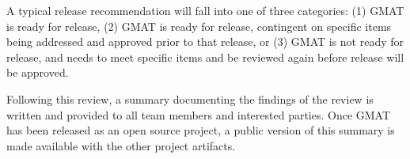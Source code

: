A typical release recommendation will fall into one of three categories: (1) GMAT is ready for release, (2) GMAT is ready for release, contingent on specific items being addressed and approved prior to that release, or (3) GMAT is not ready for release, and needs to meet specific items and be reviewed again before release will be approved.

Following this review, a summary documenting the findings of the review is written and provided to all team members and interested parties.  Once GMAT has been released as an open source project, a public version of this summary is made available with the other project artifacts.

\renewcommand\theenumi   {\arabic{enumi}}
\renewcommand\theenumii  {\arabic{enumii}}
\renewcommand\labelenumii{\theenumii.}
